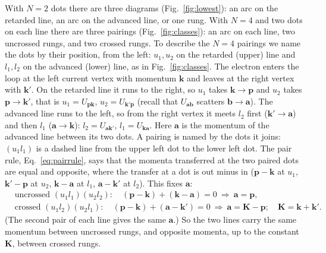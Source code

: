 With $N=2$ dots there are three diagrams
(Fig.~\ref{fig:lowest}): an arc on the retarded line, an arc on
the advanced line, or one rung. With $N=4$ and two dots on each
line there are three pairings (Fig.~\ref{fig:classes}): an arc on
each line, two uncrossed rungs, and two crossed rungs. To describe
the $N=4$ pairings we name the dots by their position, from the
left: $u_1,u_2$ on the retarded (upper) line and $l_1,l_2$ on the
advanced (lower) line, as in Fig.~\ref{fig:classes}. The electron
enters the loop at the left current vertex with momentum
$\mathbf k$ and leaves at the right vertex with $\mathbf k'$.
On the retarded line it runs to the right, so $u_1$ takes
$\mathbf k\to\mathbf p$ and $u_2$ takes $\mathbf p\to\mathbf k'$,
that is $u_1=U_{\mathbf p\mathbf k}$,
$u_2=U_{\mathbf k'\mathbf p}$ (recall that
$U_{\mathbf a\mathbf b}$ scatters $\mathbf b\to\mathbf a$).
The advanced line runs to the left, so from the right vertex it
meets $l_2$ first ($\mathbf k'\to\mathbf a$) and then $l_1$
($\mathbf a\to\mathbf k$):
$l_2=U_{\mathbf a\mathbf k'}$,
$l_1=U_{\mathbf k\mathbf a}$. Here $\mathbf a$ is the momentum
of the advanced line between its two dots. A pairing is named by
the dots it joins: $(u_1l_1)$ is a dashed line from the upper
left dot to the lower left dot. The pair rule, Eq.~\eqref{eq:pairrule}, says that
the momenta transferred at the two paired dots are equal and
opposite, where the transfer at a dot is out minus in
($\mathbf p-\mathbf k$ at $u_1$,
$\mathbf k'-\mathbf p$ at $u_2$,
$\mathbf k-\mathbf a$ at $l_1$,
$\mathbf a-\mathbf k'$ at $l_2$). This fixes $\mathbf a$:
\begin{equation}
\begin{aligned}
&\text{uncrossed } (u_1l_1)(u_2l_2):
\quad
(\mathbf p-\mathbf k)+(\mathbf k-\mathbf a)=0
\ \Rightarrow\ \mathbf a=\mathbf p,\\
&\text{crossed } (u_1l_2)(u_2l_1):
\quad
(\mathbf p-\mathbf k)+(\mathbf a-\mathbf k')=0
\ \Rightarrow\ \mathbf a=\mathbf K-\mathbf p;
\quad \mathbf K=\mathbf k+\mathbf k'.
\end{aligned}
\label{eq:aroute}
\end{equation}
(The second pair of each line gives the same $\mathbf a$.)
So the two lines carry the same momentum between uncrossed
rungs, and opposite momenta, up to the constant $\mathbf K$,
between crossed rungs.

